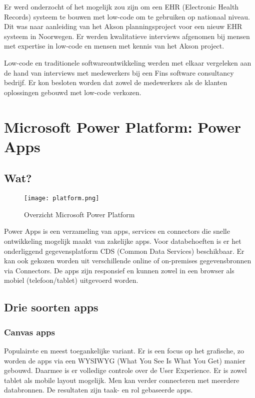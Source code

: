 Er werd onderzocht of het mogelijk zou zijn om een EHR (Electronic Health Records) systeem te bouwen met low-code om te gebruiken op nationaal niveau. Dit was naar aanleiding van het Akson planningsproject voor een nieuw EHR systeem in Noorwegen. Er werden kwalitatieve interviews afgenomen bij mensen met expertise in low-code en mensen met kennis van het Akson project. \autocite{Ness2019}

Low-code en traditionele softwareontwikkeling werden met elkaar vergeleken aan de hand van interviews met medewerkers bij een Fins software consultancy bedrijf. Er kon besloten worden dat zowel de medewerkers als de klanten oplossingen gebouwd met low-code verkozen. \autocite{Virta2018}

\section{Microsoft Power Platform: Power Apps}
\label{sec:power-platform}

\subsection{Wat?}

\begin{figure}[h!]
    \texttt{[image: platform.png]}
    \caption{Overzicht Microsoft Power Platform \autocite{MicrosoftDocs2019a}}
    \label{fig:mspowerplatform}
\end{figure}

Power Apps is een verzameling van apps, services en connectors die snelle ontwikkeling mogelijk maakt van zakelijke apps. Voor databehoeften is er het onderliggend gegevensplatform CDS (Common Data Services) beschikbaar. Er kan ook gekozen worden uit verschillende online of on-premises gegevensbronnen via Connectors. De apps zijn responsief en kunnen zowel in een browser als mobiel (telefoon/tablet) uitgevoerd worden. \autocite{MicrosoftDocs2019}

\subsection{Drie soorten apps}

\subsubsection{Canvas apps}

Populairste en meest toegankelijke variant. Er is een focus op het grafische, zo worden de apps via een WYSIWYG (What You See Is What You Get) manier gebouwd. Daarmee is er volledige controle over de User Experience. Er is zowel tablet als mobile layout mogelijk. Men kan verder connecteren met meerdere databronnen. De resultaten zijn taak- en rol gebaseerde apps. \autocite{PragmaticWorks2019}

